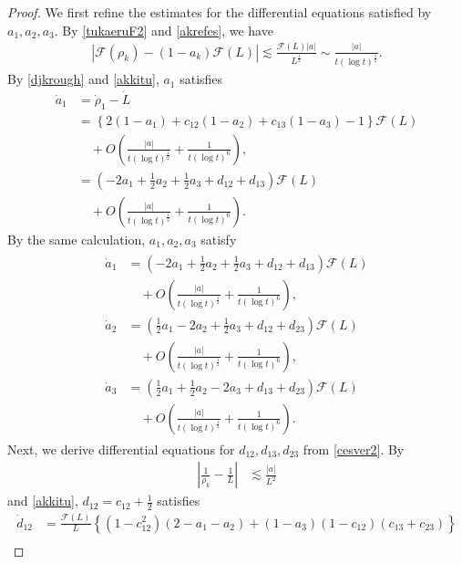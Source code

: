 \documentclass[reqno]{amsart}
\theoremstyle{plain}
\theoremstyle{definition}
\numberwithin{equation}{section}
\newcommand{\1}{\mathbbm{1}}
\begin{document}
\begin{proof}
We first refine the estimates for the differential equations satisfied by $a_1,a_2,a_3$. By \eqref{tukaeruF2} and \eqref{akrefes}, we have
\begin{align}\label{akkitu}
\left|\mathcal{F}(\rho_k)-(1-a_k)\mathcal{F}(L)\right|\lesssim \frac{\mathcal{F}(L)|a|}{L^{\frac{1}{2}}}\sim \frac{|a|}{t(\log{t})^{\frac{1}{2}}}.
\end{align}
By \eqref{djkrough} and \eqref{akkitu}, $a_1$ satisfies
\begin{align*}
\dot{a}_1&=\dot{\rho}_1-\dot{L}
\\
&=\left\{2(1-a_1)+c_{12}(1-a_2)+c_{13}(1-a_3)-1 \right\} \mathcal{F}(L)
\\
&\quad+O\left(\frac{|a|}{t(\log{t})^{\frac{1}{2}}}+\frac{1}{t(\log{t})^6}\right),
\\
&=\left(-2a_1+\frac{1}{2}a_2+\frac{1}{2}a_3+d_{12}+d_{13}\right)\mathcal{F}(L)
\\
&\quad+O\left(\frac{|a|}{t(\log{t})^{\frac{1}{2}}}+\frac{1}{t(\log{t})^6}\right).
\end{align*}
By the same calculation, $a_1,a_2,a_3$ satisfy
\begin{align}\label{aodenaiseki}
\begin{aligned}
\dot{a}_1&=\left(-2a_1+\frac{1}{2}a_2+\frac{1}{2}a_3+d_{12}+d_{13}\right)\mathcal{F}(L)
\\
&\quad+O\left(\frac{|a|}{t(\log{t})^{\frac{1}{2}}}+\frac{1}{t(\log{t})^6}\right),
\\
\dot{a}_2&=\left(\frac{1}{2}a_1-2a_2+\frac{1}{2}a_3+d_{12}+d_{23}\right)\mathcal{F}(L)
\\
&\quad+O\left(\frac{|a|}{t(\log{t})^{\frac{1}{2}}}+\frac{1}{t(\log{t})^6}\right),
\\
\dot{a}_3&=\left(\frac{1}{2}a_1+\frac{1}{2}a_2-2a_3+d_{13}+d_{23}\right)\mathcal{F}(L)
\\
&\quad+O\left(\frac{|a|}{t(\log{t})^{\frac{1}{2}}}+\frac{1}{t(\log{t})^6}\right).
\end{aligned}
\end{align}
Next, we derive differential equations for $d_{12},d_{13},d_{23}$ from \eqref{cesver2}. By 
\begin{align*}
\left|\frac{1}{\rho_k}-\frac{1}{L}\right|&\lesssim \frac{|a|}{L^2}
\end{align*}
and \eqref{akkitu}, $d_{12}=c_{12}+\frac{1}{2}$ satisfies
\begin{align*}
\dot{d}_{12}&=\frac{\mathcal{F}(L)}{L}\left\{ (1-c_{12}^2)(2-a_1-a_2)+(1-a_3)(1-c_{12})(c_{13}+c_{23})\right\}
\\

\end{align*}
\end{proof}
\end{document}
